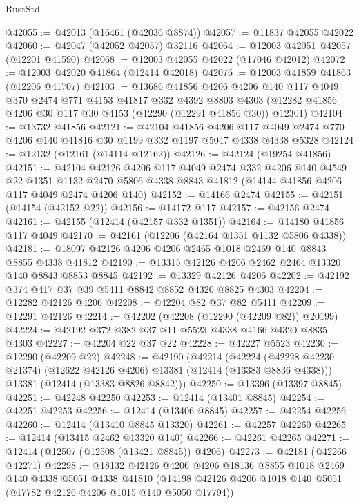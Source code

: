 \begin{lexlean}{RustStd}
\begin{coremodule}
@42055 := @42013 (@16461 (@42036 @8874))
@42057 := @11837 @42055 @42022
@42060 := @42047 (@42052 @42057) @32116
@42064 := @12003 @42051 @42057 (@12201 @41590)
@42068 := @12003 @42055 @42022 (@17046 @42012)
@42072 := @12003 @42020 @41864 (@12414 @42018)
@42076 := @12003 @41859 @41863 (@12206 @41707)
@42103 := @13686
    @41856
    @4206
    @4206
    @140
    @117
    @4049
    @370
    @2474
    @771
    @4153
    @41817
    @332
    @4392
    @8803
    @4303
    (@12282 @41856 @4206 @30 @117 @30 @4153 (@12290 (@12291 @41856 @30)) @12301)
@42104 := @13732 @41856
@42121 := @42104
    @41856
    @4206
    @117
    @4049
    @2474
    @770
    @4206
    @140
    @41816
    @30
    @1199
    @332
    @1197
    @5047
    @4338
    @4338
    @5328
@42124 := @12132 (@12161 (@14114 @12162))
@42126 := @42124 (@19254 @41856)
@42151 := @42104
    @42126
    @4206
    @117
    @4049
    @2474
    @332
    @4206
    @140
    @4549
    @22
    @1351
    @1132
    @2470
    @5806
    @4338
    @8843
    @41812
    (@14144 @41856 @4206 @117 @4049 @2474 @4206 @140)
@42152 := @14166 @2474
@42155 := @42151 (@14154 (@42152 @22))
@42156 := @14172 @117
@42157 := @42156 @2474
@42161 := @42155 (@12414 (@42157 @332 @1351))
@42164 := @14180 @41856 @117 @4049
@42170 := @42161 (@12206 (@42164 @1351 @1132 @5806 @4338))
@42181 := @18097 @42126 @4206 @4206 @2465 @1018 @2469 @140 @8843 @8855 @4338 @41812
@42190 := @13315 @42126 @4206 @2462 @2464 @13320 @140 @8843 @8853 @8845
@42192 := @13329 @42126 @4206
@42202 := @42192 @374 @417 @37 @39 @5411 @8842 @8852 @4320 @8825 @4303
@42204 := @12282 @42126 @4206
@42208 := @42204 @82 @37 @82 @5411
@42209 := @12291 @42126
@42214 := @42202 (@42208 (@12290 (@42209 @82)) @20199)
@42224 := @42192 @372 @382 @37 @11 @5523 @4338 @4166 @4320 @8835 @4303
@42227 := @42204 @22 @37 @22
@42228 := @42227 @5523
@42230 := @12290 (@42209 @22)
@42248 := @42190
    (@42214
      (@42224 (@42228 @42230 @21374) (@12622 @42126 @4206) @13381 (@12414 (@13383 @8836 @4338)))
      @13381
      (@12414 (@13383 @8826 @8842)))
@42250 := @13396 (@13397 @8845)
@42251 := @42248 @42250
@42253 := @12414 (@13401 @8845)
@42254 := @42251 @42253
@42256 := @12414 (@13406 @8845)
@42257 := @42254 @42256
@42260 := @12414 (@13410 @8845 @13320)
@42261 := @42257 @42260
@42265 := @12414 (@13415 @2462 @13320 @140)
@42266 := @42261 @42265
@42271 := @12414 (@12507 (@12508 (@13421 @8845)) @4206)
@42273 := @42181 (@42266 @42271)
@42298 := @18132
    @42126
    @4206
    @4206
    @18136
    @8855
    @1018
    @2469
    @140
    @4338
    @5051
    @4338
    @41810
    (@14198 @42126 @4206 @1018 @140 @5051 (@17782 @42126 @4206 @1015 @140 @5050 @17794))

\end{coremodule}
\end{lexlean}
